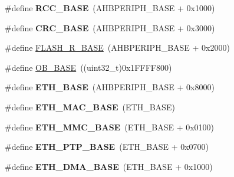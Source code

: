 \begin{DoxyCompactItemize}
\item 
\hypertarget{group___peripheral__memory__map_ga0e681b03f364532055d88f63fec0d99d}{\#define {\bfseries R\-C\-C\-\_\-\-B\-A\-S\-E}~(A\-H\-B\-P\-E\-R\-I\-P\-H\-\_\-\-B\-A\-S\-E + 0x1000)}\label{group___peripheral__memory__map_ga0e681b03f364532055d88f63fec0d99d}

\item 
\hypertarget{group___peripheral__memory__map_ga656a447589e785594cbf2f45c835ad7e}{\#define {\bfseries C\-R\-C\-\_\-\-B\-A\-S\-E}~(A\-H\-B\-P\-E\-R\-I\-P\-H\-\_\-\-B\-A\-S\-E + 0x3000)}\label{group___peripheral__memory__map_ga656a447589e785594cbf2f45c835ad7e}

\item 
\#define \hyperlink{group___peripheral__memory__map_ga8e21f4845015730c5731763169ec0e9b}{F\-L\-A\-S\-H\-\_\-\-R\-\_\-\-B\-A\-S\-E}~(A\-H\-B\-P\-E\-R\-I\-P\-H\-\_\-\-B\-A\-S\-E + 0x2000)
\item 
\#define \hyperlink{group___peripheral__memory__map_gab5b5fb155f9ee15dfb6d757da1adc926}{O\-B\-\_\-\-B\-A\-S\-E}~((uint32\-\_\-t)0x1\-F\-F\-F\-F800)
\item 
\hypertarget{group___peripheral__memory__map_gad965a7b1106ece575ed3da10c45c65cc}{\#define {\bfseries E\-T\-H\-\_\-\-B\-A\-S\-E}~(A\-H\-B\-P\-E\-R\-I\-P\-H\-\_\-\-B\-A\-S\-E + 0x8000)}\label{group___peripheral__memory__map_gad965a7b1106ece575ed3da10c45c65cc}

\item 
\hypertarget{group___peripheral__memory__map_ga3cf7005808feb61bff1fee01e50a711a}{\#define {\bfseries E\-T\-H\-\_\-\-M\-A\-C\-\_\-\-B\-A\-S\-E}~(E\-T\-H\-\_\-\-B\-A\-S\-E)}\label{group___peripheral__memory__map_ga3cf7005808feb61bff1fee01e50a711a}

\item 
\hypertarget{group___peripheral__memory__map_ga4946f2b3b03f7998343ac1778fbcf725}{\#define {\bfseries E\-T\-H\-\_\-\-M\-M\-C\-\_\-\-B\-A\-S\-E}~(E\-T\-H\-\_\-\-B\-A\-S\-E + 0x0100)}\label{group___peripheral__memory__map_ga4946f2b3b03f7998343ac1778fbcf725}

\item 
\hypertarget{group___peripheral__memory__map_gaa0f60b922aeb7275c785cbaa8f94ecf0}{\#define {\bfseries E\-T\-H\-\_\-\-P\-T\-P\-\_\-\-B\-A\-S\-E}~(E\-T\-H\-\_\-\-B\-A\-S\-E + 0x0700)}\label{group___peripheral__memory__map_gaa0f60b922aeb7275c785cbaa8f94ecf0}

\item 
\hypertarget{group___peripheral__memory__map_gace2114e1b37c1ba88d60f3e831b67e93}{\#define {\bfseries E\-T\-H\-\_\-\-D\-M\-A\-\_\-\-B\-A\-S\-E}~(E\-T\-H\-\_\-\-B\-A\-S\-E + 0x1000)}\label{group___peripheral__memory__map_gace2114e1b37c1ba88d60f3e831b67e93}


\end{DoxyCompactItemize}
